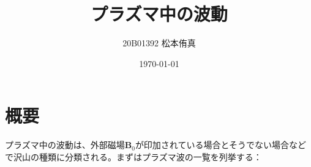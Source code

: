
\renewcommand{\labelitemii}{$\circ$}
\renewcommand{\labelitemiii}{$\triangleright$}
\title{プラズマ中の波動}
\author{20B01392 松本侑真}
\date{\today}

\maketitle
\begin{abstract}

\end{abstract}
\tableofcontents
\newpage

\section{概要}
プラズマ中の波動は、外部磁場$\bm{B}_0$が印加されている場合とそうでない場合などで沢山の種類に分類される。まずはプラズマ波の一覧を列挙する：

